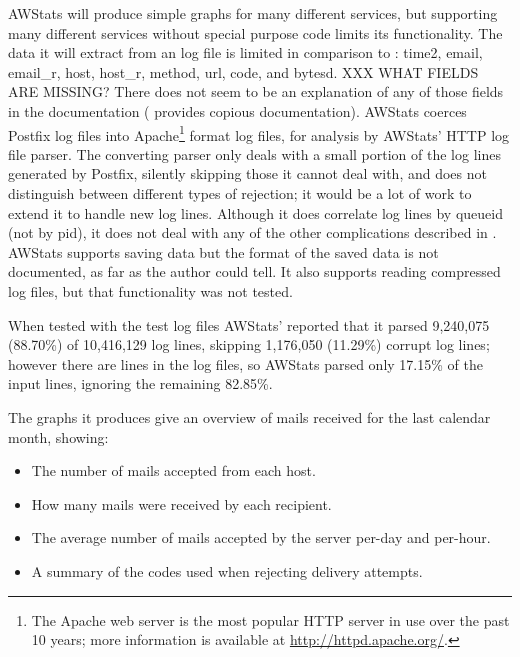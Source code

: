 AWStats will produce simple graphs for many different services, but
supporting many different services without special purpose code limits its
functionality.  The data it will extract from an \MTA{} log file is limited
in comparison to \parsername{}: \newline{} \tab{} time2, email, email\_r,
host, host\_r, method, url, code, and bytesd.\newline{} XXX WHAT FIELDS ARE
MISSING\@?  There does not seem to be an explanation of any of those fields
in the documentation (\parsername{} provides copious documentation).
AWStats coerces Postfix log files into Apache\footnote{The Apache web
server is the most popular HTTP server in use over the past 10 years; more
information is available at \url{http://httpd.apache.org/}.} format log
files, for analysis by AWStats' HTTP log file parser.  The converting
parser only deals with a small portion of the log lines generated by
Postfix, silently skipping those it cannot deal with, and does not
distinguish between different types of rejection; it would be a lot of work
to extend it to handle new log lines.  Although it does correlate log lines
by queueid (not by pid), it does not deal with any of the other
complications described in .  AWStats supports
saving data but the format of the saved data is not documented, as far as
the author could tell.  It also supports reading compressed log files, but
that functionality was not tested.

When tested with the \numberOFlogFILES{} test log files AWStats' reported
that it parsed 9,240,075 (88.70\%) of 10,416,129 log lines, skipping
1,176,050 (11.29\%) corrupt log lines; however there are
\numberOFlogLINES{} lines in the \numberOFlogFILES{} log files, so AWStats
parsed only 17.15\% of the input lines, ignoring the remaining 82.85\%.

The graphs it produces give an overview of mails received for the last
calendar month, showing:

\begin{itemize}

    \item The number of mails accepted from each host.

    \item How many mails were received by each recipient.

    \item The average number of mails accepted by the server per-day and
        per-hour.

    \item A summary of the \SMTP{} codes used when rejecting delivery
        attempts.

\end{itemize}

